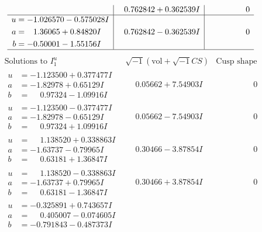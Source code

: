 \documentclass[1p]{elsarticle_modified}
\theoremstyle{definition}
\newcommand{\I}{\sqrt{-1}}
\begin{document}
$$\begin{array}{c|c|c}
 & \phantom{-}0.762842 + 0.362539 I & \phantom{-0.000000 } 0 \\ \hline\begin{aligned}
u &= -1.026570 - 0.575028 I \\
a &= \phantom{-}1.36065 + 0.84820 I \\
b &= -0.50001 - 1.55156 I\end{aligned}
 & \phantom{-}0.762842 - 0.362539 I & \phantom{-0.000000 } 0\\
 \hline 
 \end{array}$$\newpage$$\begin{array}{c|c|c}  
\text{Solutions to }I^u_{1}& \I (\text{vol} + \sqrt{-1}CS) & \text{Cusp shape}\\
 \hline 
\begin{aligned}
u &= -1.123500 + 0.377477 I \\
a &= -1.82978 + 0.65129 I \\
b &= \phantom{-}0.97324 - 1.09916 I\end{aligned}
 & \phantom{-}0.05662 + 7.54903 I & \phantom{-0.000000 } 0 \\ \hline\begin{aligned}
u &= -1.123500 - 0.377477 I \\
a &= -1.82978 - 0.65129 I \\
b &= \phantom{-}0.97324 + 1.09916 I\end{aligned}
 & \phantom{-}0.05662 - 7.54903 I & \phantom{-0.000000 } 0 \\ \hline\begin{aligned}
u &= \phantom{-}1.138520 + 0.338863 I \\
a &= -1.63737 - 0.79965 I \\
b &= \phantom{-}0.63181 + 1.36847 I\end{aligned}
 & \phantom{-}0.30466 - 3.87854 I & \phantom{-0.000000 } 0 \\ \hline\begin{aligned}
u &= \phantom{-}1.138520 - 0.338863 I \\
a &= -1.63737 + 0.79965 I \\
b &= \phantom{-}0.63181 - 1.36847 I\end{aligned}
 & \phantom{-}0.30466 + 3.87854 I & \phantom{-0.000000 } 0 \\ \hline\begin{aligned}
u &= -0.325891 + 0.743657 I \\
a &= \phantom{-}0.405007 - 0.074605 I \\
b &= -0.791843 - 0.487373 I\end{aligned}

\end{array}$$
\end{document}

